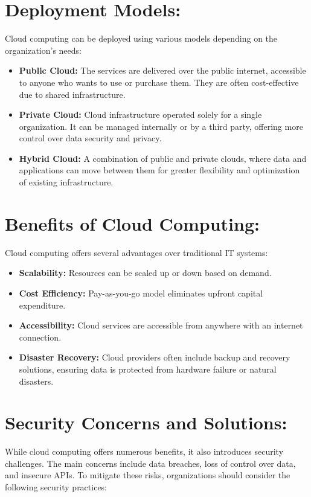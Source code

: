 \documentclass[14pt]{article}
\begin{document}
\section{Deployment Models:}
Cloud computing can be deployed using various models depending on the organization's needs:

\begin{itemize}
    \item \textbf{Public Cloud:} The services are delivered over the public internet, accessible to anyone who wants to use or purchase them. They are often cost-effective due to shared infrastructure.
    \item \textbf{Private Cloud:} Cloud infrastructure operated solely for a single organization. It can be managed internally or by a third party, offering more control over data security and privacy.
    \item \textbf{Hybrid Cloud:} A combination of public and private clouds, where data and applications can move between them for greater flexibility and optimization of existing infrastructure.
\end{itemize}

\section{Benefits of Cloud Computing:}
Cloud computing offers several advantages over traditional IT systems:

\begin{itemize}
    \item \textbf{Scalability:} Resources can be scaled up or down based on demand.
    \item \textbf{Cost Efficiency:} Pay-as-you-go model eliminates upfront capital expenditure.
    \item \textbf{Accessibility:} Cloud services are accessible from anywhere with an internet connection.
    \item \textbf{Disaster Recovery:} Cloud providers often include backup and recovery solutions, ensuring data is protected from hardware failure or natural disasters.
\end{itemize}

\section{Security Concerns and Solutions:}
While cloud computing offers numerous benefits, it also introduces security challenges. The main concerns include data breaches, loss of control over data, and insecure APIs. To mitigate these risks, organizations should consider the following security practices:
\end{document}
